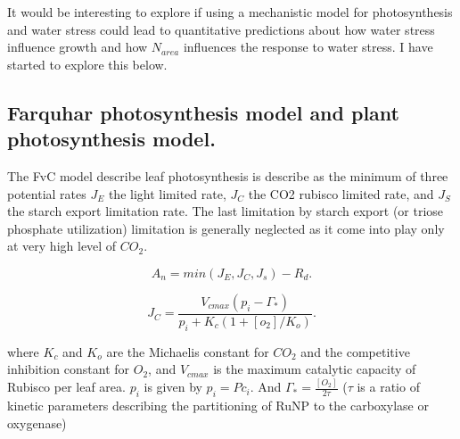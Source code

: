 \documentclass[a4paper,11pt]{article}
\begin{document}
It would be interesting to explore if using a mechanistic model for
photosynthesis and water stress could lead to quantitative predictions
about how water stress influence growth and how $N_{area}$ influences the response to water stress. I have started to explore this below.


\subsection{Farquhar photosynthesis model and plant photosynthesis model.}

The FvC model describe leaf photosynthesis is describe as the minimum
of three potential rates $J_E$ the light limited rate, $J_C$ the CO2
rubisco limited rate, and $J_S$ the starch export limitation rate. The
last limitation by starch export (or triose phosphate utilization)
limitation is generally neglected as it come into play only at very
high level of $CO_2$.

\begin{equation}
\label{eq:An}
A_n= min(J_E, J_C, J_s) - R_d.
\end{equation}






\begin{equation}
\label{eq:JC}
J_C= \frac{V_{cmax} (p_i - \Gamma_*)}{p_i + K_c (1+[o_2]/K_o)}.
\end{equation}

where $K_c$ and $K_o$ are the Michaelis constant for $CO_2$ and the competitive inhibition constant for $O_2$, and $V_{cmax}$ is the maximum catalytic capacity of Rubisco per leaf area.
$p_i$ is given by $p_i = P c_i$. And $\Gamma_* = \frac{[O_2]}{2\tau}$ ($\tau$ is a ratio of kinetic parameters describing the partitioning of RuNP to the carboxylase or oxygenase)
\end{document}

